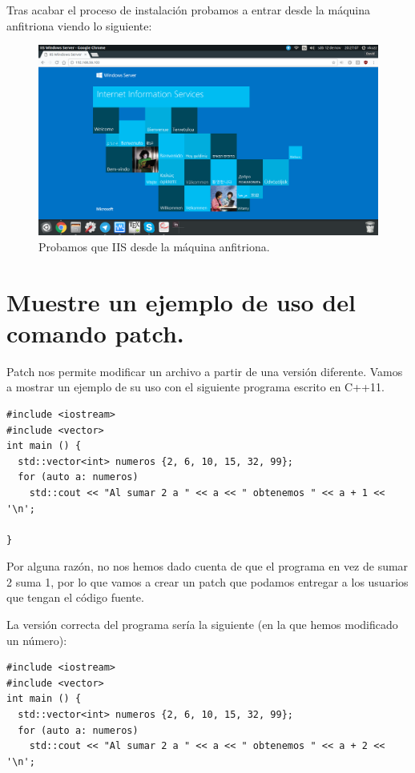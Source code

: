 \begin{flushleft}
Tras acabar el proceso de instalación probamos a entrar desde la máquina anfitriona viendo lo siguiente:
\begin{figure}[H]
	\centering
	\includegraphics[scale=0.3]{iisTest.png}
	\caption{Probamos que IIS desde la máquina anfitriona.}
\end{figure}


\section{Muestre un ejemplo de uso del comando patch.}
Patch \cite{c11} nos permite modificar un archivo a partir de una versión diferente. Vamos a mostrar un ejemplo de su uso con el siguiente programa escrito en C++11.

\begin{verbatim}
#include <iostream>
#include <vector>
int main () {
  std::vector<int> numeros {2, 6, 10, 15, 32, 99};
  for (auto a: numeros) 
    std::cout << "Al sumar 2 a " << a << " obtenemos " << a + 1 << '\n';
  
}
\end{verbatim}

Por alguna razón, no nos hemos dado cuenta de que el programa en vez de sumar 2 suma 1, por lo que vamos a crear un patch que podamos entregar a los usuarios que tengan el código fuente. 

La versión correcta del programa sería la siguiente (en la que hemos modificado un número):
\begin{verbatim}
#include <iostream>
#include <vector>
int main () {
  std::vector<int> numeros {2, 6, 10, 15, 32, 99};
  for (auto a: numeros) 
    std::cout << "Al sumar 2 a " << a << " obtenemos " << a + 2 << '\n';
  

\end{verbatim}
\end{flushleft}
